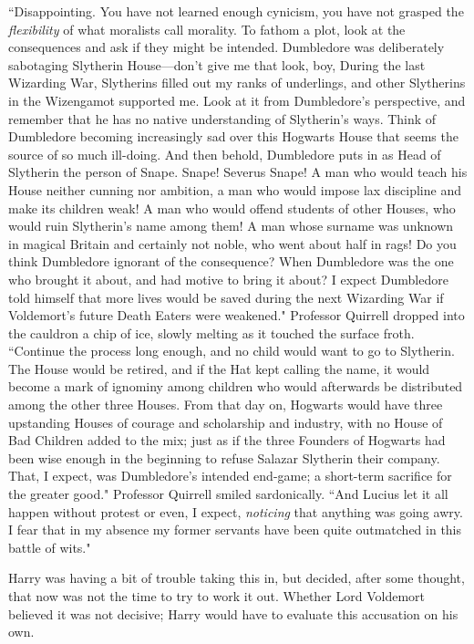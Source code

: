 ``Disappointing. You have not learned enough cynicism, you have not grasped the \emph{flexibility} of what moralists call morality. To fathom a plot, look at the consequences and ask if they might be intended. Dumbledore was deliberately sabotaging Slytherin House—don't give me that look, boy,  During the last Wizarding War, Slytherins filled out my ranks of underlings, and other Slytherins in the Wizengamot supported me. Look at it from Dumbledore's perspective, and remember that he has no native understanding of Slytherin's ways. Think of Dumbledore becoming increasingly sad over this Hogwarts House that seems the source of so much ill-doing. And then behold, Dumbledore puts in as Head of Slytherin the person of Snape. Snape! Severus Snape! A man who would teach his House neither cunning nor ambition, a man who would impose lax discipline and make its children weak! A man who would offend students of other Houses, who would ruin Slytherin's name among them! A man whose surname was unknown in magical Britain and certainly not noble, who went about half in rags! Do you think Dumbledore ignorant of the consequence? When Dumbledore was the one who brought it about, and had motive to bring it about? I expect Dumbledore told himself that more lives would be saved during the next Wizarding War if Voldemort's future Death Eaters were weakened." Professor Quirrell dropped into the cauldron a chip of ice, slowly melting as it touched the surface froth. ``Continue the process long enough, and no child would want to go to Slytherin. The House would be retired, and if the Hat kept calling the name, it would become a mark of ignominy among children who would afterwards be distributed among the other three Houses. From that day on, Hogwarts would have three upstanding Houses of courage and scholarship and industry, with no House of Bad Children added to the mix; just as if the three Founders of Hogwarts had been wise enough in the beginning to refuse Salazar Slytherin their company. That, I expect, was Dumbledore's intended end-game; a short-term sacrifice for the greater good." Professor Quirrell smiled sardonically. ``And Lucius let it all happen without protest or even, I expect, \emph{noticing} that anything was going awry. I fear that in my absence my former servants have been quite outmatched in this battle of wits."

Harry was having a bit of trouble taking this in, but decided, after some thought, that now was not the time to try to work it out. Whether Lord Voldemort believed it was not decisive; Harry would have to evaluate this accusation on his own.

